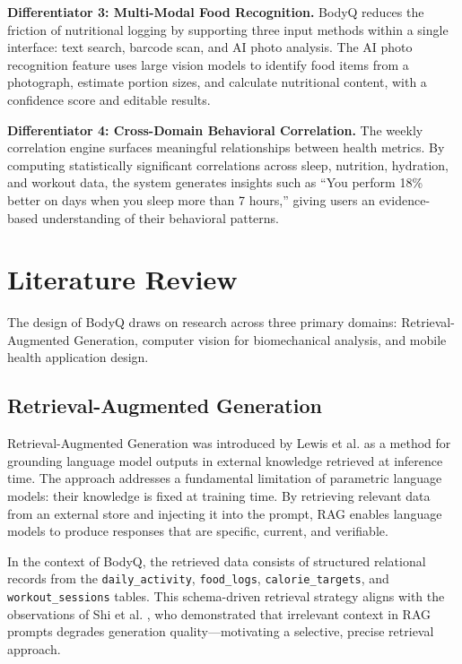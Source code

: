 \textbf{Differentiator 3: Multi-Modal Food Recognition.}
BodyQ reduces the friction of nutritional logging by supporting three
input methods within a single interface: text search, barcode scan, and
AI photo analysis. The AI photo recognition feature uses large vision
models to identify food items from a photograph, estimate portion sizes,
and calculate nutritional content, with a confidence score and editable
results.

\textbf{Differentiator 4: Cross-Domain Behavioral Correlation.}
The weekly correlation engine surfaces meaningful relationships between
health metrics. By computing statistically significant correlations across
sleep, nutrition, hydration, and workout data, the system generates
insights such as ``You perform 18\% better on days when you sleep more
than 7 hours,'' giving users an evidence-based understanding of their
behavioral patterns.

\section{Literature Review}

The design of BodyQ draws on research across three primary domains:
Retrieval-Augmented Generation, computer vision for biomechanical
analysis, and mobile health application design.

\subsection{Retrieval-Augmented Generation}

Retrieval-Augmented Generation was introduced by Lewis et al.
\cite{lewis2020rag} as a method for grounding language model outputs in
external knowledge retrieved at inference time. The approach addresses a
fundamental limitation of parametric language models: their knowledge is
fixed at training time. By retrieving relevant data from an external
store and injecting it into the prompt, RAG enables language models to
produce responses that are specific, current, and verifiable.

In the context of BodyQ, the retrieved data consists of structured
relational records from the \texttt{daily\_activity}, \texttt{food\_logs},
\texttt{calorie\_targets}, and \texttt{workout\_sessions} tables. This
schema-driven retrieval strategy aligns with the observations of Shi
et al. \cite{shi2023irrelevant}, who demonstrated that irrelevant context
in RAG prompts degrades generation quality---motivating a selective,
precise retrieval approach.

